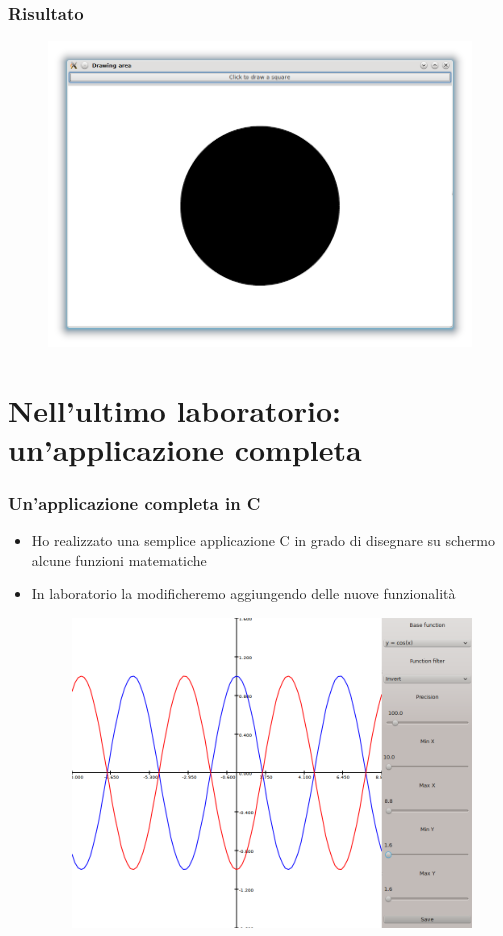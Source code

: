 \documentclass{beamer}
\begin{document}
\begin{frame}
\frametitle{Risultato}
\begin{figure}
 \includegraphics[width=0.99\columnwidth]{img/6}
\end{figure}
\end{frame}


\section{Nell'ultimo laboratorio: un'applicazione completa}

\begin{frame}
\frametitle{Un'applicazione completa in C}
\begin{itemize}
 \item Ho realizzato una semplice applicazione C in grado di disegnare su schermo alcune funzioni matematiche
 \item In laboratorio la modificheremo aggiungendo delle nuove funzionalità
\begin{figure}
 \includegraphics[width=0.5\columnwidth]{img/fd}
\end{figure}
\end{itemize}
\end{frame}

% 
\end{document}
